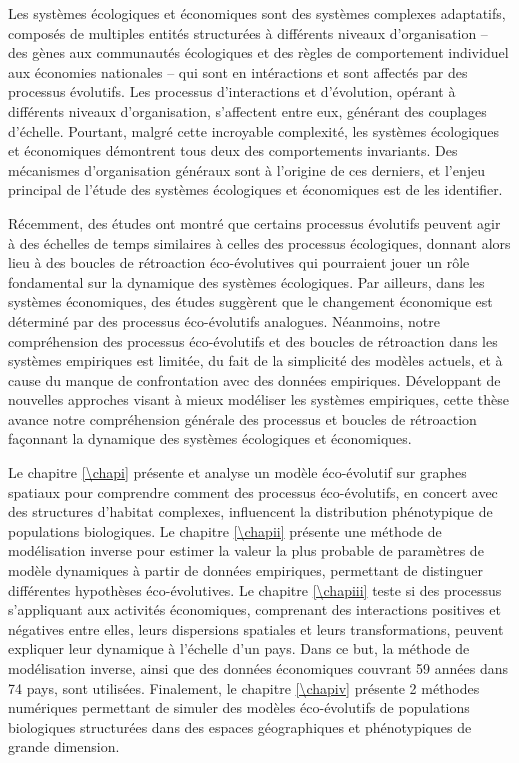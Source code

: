 \small{
\noindent Les systèmes écologiques et économiques sont des systèmes complexes adaptatifs, composés de multiples entités structurées à différents niveaux d'organisation -- des gènes aux communautés écologiques et des règles de comportement individuel aux économies nationales -- qui sont en intéractions et sont affectés par des processus évolutifs. Les processus d'interactions et d'évolution, opérant à différents niveaux d'organisation, s'affectent entre eux, générant des couplages d'échelle. Pourtant, malgré cette incroyable complexité, les systèmes écologiques et économiques démontrent tous deux des comportements invariants. Des mécanismes d'organisation généraux sont à l'origine de ces derniers, et l'enjeu principal de l'étude des systèmes écologiques et économiques est de les identifier.
 
Récemment, des études ont montré que certains processus évolutifs peuvent agir à des échelles de temps similaires à celles des processus écologiques, donnant alors lieu à des boucles de rétroaction éco-évolutives qui pourraient jouer un rôle fondamental sur la dynamique des systèmes écologiques. Par ailleurs, dans les systèmes économiques, des études suggèrent que le changement économique est déterminé par des processus éco-évolutifs analogues. Néanmoins, notre compréhension des processus éco-évolutifs et des boucles de rétroaction dans les systèmes empiriques est limitée, du fait de la simplicité des modèles actuels, et à cause du manque de confrontation avec des données empiriques.  Développant de nouvelles approches visant à mieux modéliser les systèmes empiriques, cette thèse avance notre compréhension générale des processus et boucles de rétroaction façonnant la dynamique des systèmes écologiques et économiques.
 
Le chapitre \ref{\chapi} présente et analyse un modèle éco-évolutif sur graphes spatiaux pour comprendre comment des processus éco-évolutifs, en concert avec des structures d'habitat complexes, influencent la distribution phénotypique de populations biologiques. Le chapitre \ref{\chapii} présente une méthode de modélisation inverse pour estimer la valeur la plus probable de paramètres de modèle dynamiques à partir de données empiriques, permettant de distinguer différentes hypothèses éco-évolutives. Le chapitre \ref{\chapiii} teste si des processus s'appliquant aux activités économiques, comprenant des interactions positives et négatives entre elles, leurs dispersions spatiales et leurs transformations, peuvent expliquer leur dynamique à l'échelle d'un pays. Dans ce but, la méthode de modélisation inverse, ainsi que des données économiques couvrant 59 années dans 74 pays, sont utilisées. Finalement, le chapitre \ref{\chapiv} présente 2 méthodes numériques permettant de simuler des modèles éco-évolutifs de populations biologiques structurées dans des espaces géographiques et phénotypiques de grande dimension.
 
}

